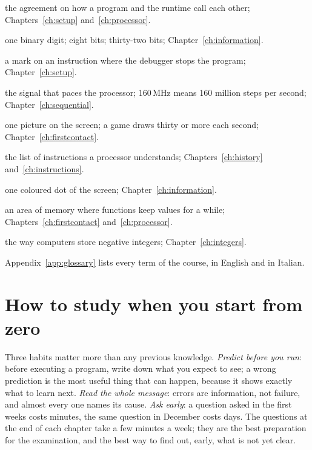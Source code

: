 \begin{description}\small
\item[ABI] the agreement on how a program and the runtime call each other; Chapters~\ref{ch:setup} and~\ref{ch:processor}.
\item[Bit, byte, word] one binary digit; eight bits; thirty-two bits; Chapter~\ref{ch:information}.
\item[Breakpoint] a mark on an instruction where the debugger stops the program; Chapter~\ref{ch:setup}.
\item[Clock] the signal that paces the processor; 160\,MHz means 160 million steps per second; Chapter~\ref{ch:sequential}.
\item[Frame] one picture on the screen; a game draws thirty or more each second; Chapter~\ref{ch:firstcontact}.
\item[Instruction set (ISA)] the list of instructions a processor understands; Chapters~\ref{ch:history} and~\ref{ch:instructions}.
\item[Pixel] one coloured dot of the screen; Chapter~\ref{ch:information}.
\item[Stack] an area of memory where functions keep values for a while; Chapters~\ref{ch:firstcontact} and~\ref{ch:processor}.
\item[Two's complement] the way computers store negative integers; Chapter~\ref{ch:integers}.
\end{description}

\noindent Appendix~\ref{app:glossary} lists every term of the course, in
English and in Italian.

\section*{How to study when you start from zero}

Three habits matter more than any previous knowledge. \emph{Predict before you
run}: before executing a program, write down what you expect to see; a wrong
prediction is the most useful thing that can happen, because it shows exactly
what to learn next. \emph{Read the whole message}: errors are information, not
failure, and almost every one names its cause. \emph{Ask early}: a question
asked in the first weeks costs minutes, the same question in December costs
days. The questions at the end of each chapter take a few minutes a week; they
are the best preparation for the examination, and the best way to find out,
early, what is not yet clear.
